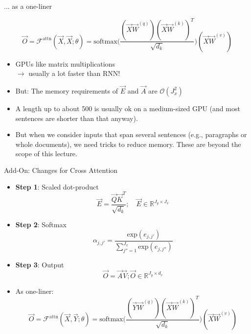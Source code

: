 \begin{vbframe}{... as a one-liner}

\vfill

\large
$$ \vec O = \mathcal{F}^\mathrm{attn}(\vec X, \vec X; \theta) = \mathrm{softmax}\Big(\frac{(\vec X\vec W^{(q)} ) (\vec X\vec W^{(k)} )^T}{\sqrt{d_k}}\Big)(\vec X\vec W^{(v)} ) $$
\begin{itemize}
\item GPUs like matrix multiplications\\$\rightarrow$ usually a lot faster than RNN!
\item But: The memory requirements of $\vec E$ and $\vec A$ are $\mathcal{O}(J_x^2)$
\item A length up to about 500 is usually ok on a medium-sized GPU (and most sentences are shorter than that anyway).
\item But when we consider inputs that span several sentences (e.g., paragraphs or whole documents), we need tricks to reduce memory. These are beyond the scope of this lecture.
\end{itemize}

\vfill

\end{vbframe}


\begin{vbframe}{Add-On: Changes for Cross Attention}

\vfill

\begin{itemize}
	  \item \textbf{Step 1}: Scaled dot-product $$\vec {E} = \frac{ \vec {Q} \vec {K}^T}{\sqrt{d_k}}; \quad \vec E \in \mathbb{R}^{J_y \times J_x}$$
	  \item \textbf{Step 2}: Softmax $$\alpha_{j,j'} = \frac{\mathrm{exp}(e_{j,j'})}{\sum_{j''=1}^{J_x} \mathrm{exp}(e_{j,j''})}$$
		\item \textbf{Step 3}: Output $$\vec {O} = \vec {A} \vec {V}; \vec O \in \mathbb{R}^{J_y \times d_v}$$
		\item As one-liner: $$ \vec O = \mathcal{F}^\mathrm{attn}(\vec X, \vec Y; \theta) = \mathrm{softmax}\Big(\frac{(\vec Y\vec W^{(q)} ) (\vec X\vec W^{(k)} )^T}{\sqrt{d_k}}\Big)(\vec X\vec W^{(v)} ) $$
\end{itemize}

\vfill

\end{vbframe}

